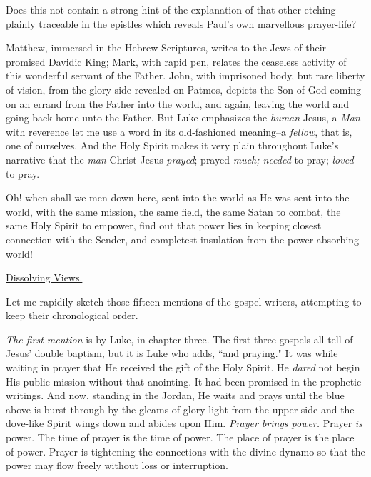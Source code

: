 Does this not contain a strong hint of the explanation of that other
etching plainly traceable in the epistles which reveals Paul's own
marvellous prayer-life?

Matthew, immersed in the Hebrew Scriptures, writes to the Jews of their
promised Davidic King; Mark, with rapid pen, relates the ceaseless
activity of this wonderful servant of the Father. John, with imprisoned
body, but rare liberty of vision, from the glory-side revealed on Patmos,
depicts the Son of God coming on an errand from the Father into the world,
and again, leaving the world and going back home unto the Father. But Luke
emphasizes the \textit{human} Jesus, a \textit{Man}--with reverence let me use a word in
its old-fashioned meaning--a \textit{fellow}, that is, one of ourselves. And the
Holy Spirit makes it very plain throughout Luke's narrative that the \textit{man}
Christ Jesus \textit{prayed}; prayed \textit{much; needed} to pray; \textit{loved} to pray.

Oh! when shall we men down here, sent into the world as He was sent into
the world, with the same mission, the same field, the same Satan to
combat, the same Holy Spirit to empower, find out that power lies in
keeping closest connection with the Sender, and completest insulation from
the power-absorbing world!



\underline{Dissolving Views.}


Let me rapidily sketch those fifteen mentions of the gospel writers,
attempting to keep their chronological order.

\textit{The first mention} is by Luke, in chapter three. The first three gospels
all tell of Jesus' double baptism, but it is Luke who adds, ``and praying."
It was while waiting in prayer that He received the gift of the Holy
Spirit. He \textit{dared} not begin His public mission without that anointing. It
had been promised in the prophetic writings. And now, standing in the
Jordan, He waits and prays until the blue above is burst through by the
gleams of glory-light from the upper-side and the dove-like Spirit wings
down and abides upon Him. \textit{Prayer brings power.} Prayer \textit{is} power. The
time of prayer is the time of power. The place of prayer is the place of
power. Prayer is tightening the connections with the divine dynamo so that
the power may flow freely without loss or interruption.

